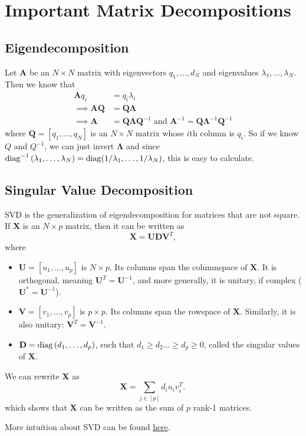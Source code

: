 \documentclass[11pt]{article}
\theoremstyle{definition}
\newcommand{\XX}{\mathbf{X}}
\renewcommand{\AA}{\mathbf{A}}
\newcommand{\QQ}{\mathbf{Q}}
\newcommand{\UU}{\mathbf{U}}
\newcommand{\DD}{\mathbf{D}}
\newcommand{\VV}{\mathbf{V}}
\newcommand{\LL}{\mathbf{\Lambda}}
\begin{document}
\section{Important Matrix Decompositions}

\subsection{Eigendecomposition}
Let $\AA$ be an $N\times N$ matrix with eigenvectors $q_1,\ldots,d_N$ and
eigenvalues $\lambda_1,\ldots,\lambda_N$. Then we know that
\begin{equation}
	\begin{split}
		\AA q_i &=  q_i\lambda_i \\
		\implies\AA\QQ &= \QQ\LL \\
		\implies\AA &= \QQ\LL\QQ^{-1}\text{ and }\AA^{-1}=\QQ\LL^{-1}\QQ^{-1}
	\end{split}
\end{equation}
where $\QQ=[q_1,\ldots,q_N]$ is an $N\times N$ matrix whose $i$th column is
$q_i$. So if we know $Q$ and $Q^{-1}$, we can just invert $\LL$ and since
$\operatorname*{diag}^{-1}{(\lambda_1,\ldots,\lambda_N)}=\operatorname*{diag}(1/\lambda_1,\ldots,1/\lambda_N)$,
this is easy to calculate.

\subsection{Singular Value Decomposition}
SVD is the generalization of eigendecomposition for matrices that are not
square. If $\XX$ is an $N\times p$ matrix, then it can be written as
\[\XX = \UU \DD \VV^T,\]
where
\begin{itemize}
	\item $\UU=[u_1,\ldots,u_p]$ is $N\times p$. Its columns span the
	      columnspace of $\XX$. It is orthogonal, meaning $\UU^T=\UU^{-1}$, and more
	      generally, it is unitary, if complex ($\UU^*=\UU^{-1}$).
	\item $\VV=[v_1,\ldots,v_p]$ is $p\times p$. Its columns span the rowspace
	      of $\XX$. Similarly, it is also unitary: $\VV^T=\VV^{-1}$.
	\item $\DD=\diag{(d_1,\ldots,d_p)}$, such that $d_1\ge d_2\ldots\ge d_p\ge
		      0$, called the singular values of $\XX$.
\end{itemize}
We can rewrite $\XX$ as
\[\XX=\sum_{j\in[p]}d_iu_iv_i^T.\,\]
which shows that $\XX$ can be written as the sum of $p$ rank-1 matrices.

More intuition about SVD can be found
\href{https://stats.stackexchange.com/questions/177102/what-is-the-intuition-behind-svd}{here}.
\end{document}
